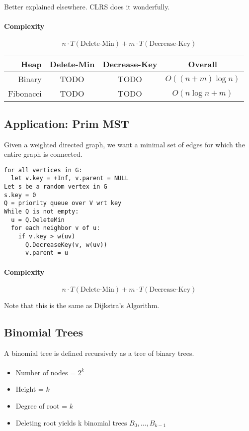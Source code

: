 \documentclass[a4paper]{article}
\begin{document}
Better explained elsewhere. CLRS does it wonderfully.

\paragraph{Complexity}

\[
n \cdot T(\text{Delete-Min}) + m \cdot T(\text{Decrease-Key})
\]

\begin{tabu} to \linewidth{|r|c|c|c|}
\hline
Heap & Delete-Min & Decrease-Key & Overall \\
\hline
Binary & TODO & TODO & $O((n+m)\log n)$ \\
\hline
Fibonacci & TODO & TODO & $O(n\log n + m)$ \\
\hline
\end{tabu}

\subsection{Application: Prim MST}
Given a weighted directed graph, we want a minimal set of edges for which the entire graph is connected.

\begin{lstlisting}[frame=L]
for all vertices in G:
  let v.key = +Inf, v.parent = NULL
Let s be a random vertex in G
s.key = 0
Q = priority queue over V wrt key
While Q is not empty:
  u = Q.DeleteMin
  for each neighbor v of u:
    if v.key > w(uv)
      Q.DecreaseKey(v, w(uv))
      v.parent = u
\end{lstlisting}

\paragraph{Complexity}

\[
n \cdot T(\text{Delete-Min}) + m \cdot T(\text{Decrease-Key})
\]

Note that this is the same as Dijkstra's Algorithm.

\subsection{Binomial Trees}
A binomial tree is defined recursively as a tree of binary trees.

\paragraph{}

\begin{itemize}
\item Number of nodes = $2^k$
\item Height = $k$
\item Degree of root = $k$
\item Deleting root yields k binomial trees $B_0,...,B_{k-1}$
\end{itemize}
\end{document}
